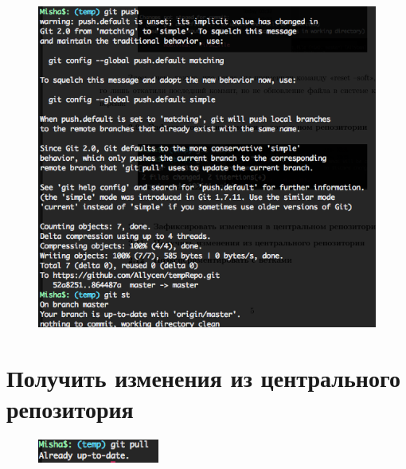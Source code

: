 \documentclass[utf8x, 12pt]{G7-32}
\begin{document}
\begin{figure}[hhh!]
	\begin{center}
		\includegraphics[width=12cm]{img/11}
	\end{center}
\end{figure}


\section{Получить изменения из центрального репозитория}

\begin{figure}[hhh!]
	\begin{center}
		\includegraphics[width=4cm]{img/12}
	\end{center}
\end{figure}	
\end{document}
